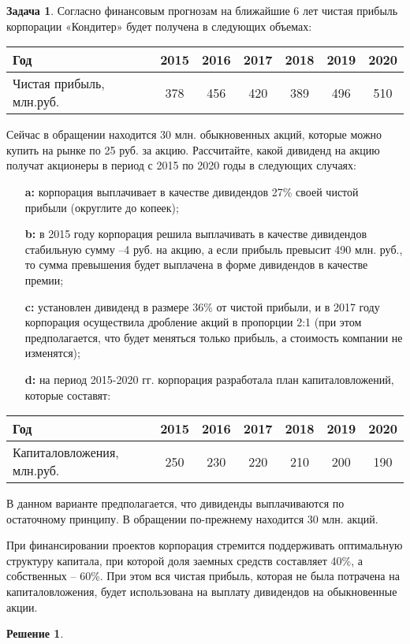 \documentclass[a4paper, 14pt]{article}
\theoremstyle{plain} %
\theoremstyle{definition} %
\newtheorem*{solution}{Решение}
\newtheorem{problem}{Задача}[subsection]
\theoremstyle{remark} %
\begin{document}
\begin{problem}
	Согласно финансовым прогнозам на ближайшие 6 лет чистая прибыль корпорации «Кондитер» будет получена в следующих объемах:
\begin{center}
\begin{tabular}[0.88\textwidth]{|l|c|c|c|c|c|c|}
\hline
Год                      & 2015 & 2016 & 2017 & 2018 & 2019 & 2020  \\
\hline
Чистая прибыль, млн.руб. & 378  & 456  & 420  & 389  & 496  & 510   \\
\hline
\end{tabular}
\end{center}
	Сейчас в обращении находится 30 млн. обыкновенных акций, которые можно купить на рынке по 25 руб. за акцию. Рассчитайте, какой дивиденд на акцию получат акционеры в период с 2015 по 2020 годы в следующих случаях:
	\begin{itemize}
		\item[\textbf{a:}] корпорация  выплачивает  в  качестве  дивидендов  27\%  своей  чистой  прибыли (округлите до копеек);
		\item[\textbf{b:}] в 2015 году корпорация решила выплачивать в качестве дивидендов стабильную сумму –4 руб. на акцию, а если прибыль превысит 490 млн. руб., то сумма превышения будет выплачена в форме дивидендов в качестве премии;
		\item[\textbf{c:}] установлен дивиденд в размере 36\% от чистой прибыли, и в 2017 году корпорация осуществила дробление акций в пропорции 2:1 (при этом предполагается, что будет меняться только прибыль, а стоимость компании не изменятся);
		\item[\textbf{d:}] на период 2015-2020 гг. корпорация разработала план капиталовложений, которые составят:
	\end{itemize}
	\begin{center}
	\begin{tabular}[0.88\textwidth]{|l|c|c|c|c|c|c|}
	\hline
	Год                        & 2015 & 2016 & 2017 & 2018 & 2019 & 2020  \\
	\hline
	Капиталовложения, млн.руб. & 250  & 230  & 220  & 210  & 200  & 190   \\
	\hline
	\end{tabular}
\end{center}

	В данном варианте предполагается, что дивиденды выплачиваются по остаточному принципу. В  обращении  по-прежнему  находится  30  млн.  акций.

	При  финансировании проектов корпорация стремится поддерживать оптимальную структуру капитала, при которой доля заемных средств составляет 40\%, а собственных – 60\%. При этом вся чистая прибыль, которая не была потрачена на капиталовложения, будет использована на выплату дивидендов на обыкновенные акции.
	\begin{solution}

	\end{solution}
\end{problem}
\end{document}

